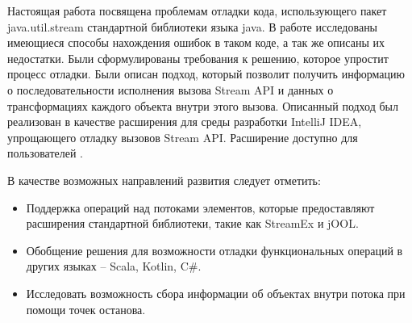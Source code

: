 Настоящая работа посвящена проблемам отладки кода, использующего пакет \\ java.util.stream стандартной библиотеки языка java. В работе исследованы имеющиеся способы нахождения ошибок в таком коде, а так же описаны их недостатки. Были сформулированы требования к решению, которое упростит процесс отладки. Были описан подход, который позволит получить информацию о последовательности исполнения вызова Stream API и данных о трансформациях каждого объекта внутри этого вызова. Описанный подход был реализован в качестве расширения для среды разработки IntelliJ IDEA, упрощающего отладку вызовов Stream API. Расширение доступно для пользователей \cite{java:stream-debugger}.

В качестве возможных направлений развития следует отметить:
\begin{itemize}
	\item Поддержка операций над потоками элементов, которые предоставляют расширения стандартной библиотеки, такие как StreamEx и jOOL.
	\item Обобщение решения для возможности отладки функциональных операций в других языках -- Scala, Kotlin, C\#.
	\item Исследовать возможность сбора информации об объектах внутри потока при помощи точек останова.
\end{itemize}
